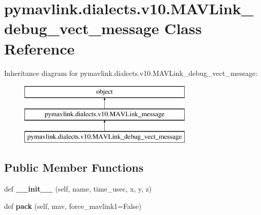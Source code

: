 \hypertarget{classpymavlink_1_1dialects_1_1v10_1_1MAVLink__debug__vect__message}{}\section{pymavlink.\+dialects.\+v10.\+M\+A\+V\+Link\+\_\+debug\+\_\+vect\+\_\+message Class Reference}
\label{classpymavlink_1_1dialects_1_1v10_1_1MAVLink__debug__vect__message}
Inheritance diagram for pymavlink.\+dialects.\+v10.\+M\+A\+V\+Link\+\_\+debug\+\_\+vect\+\_\+message\+:\begin{figure}[H]
\begin{center}
\leavevmode
\includegraphics[height=3.000000cm]{classpymavlink_1_1dialects_1_1v10_1_1MAVLink__debug__vect__message}
\end{center}
\end{figure}
\subsection*{Public Member Functions}
\begin{DoxyCompactItemize}
\item 
\mbox{\label{classpymavlink_1_1dialects_1_1v10_1_1MAVLink__debug__vect__message_ae6115920ccc058da1b8aee2a61f2d9fc}} 
def {\bfseries \+\_\+\+\_\+init\+\_\+\+\_\+} (self, name, time\+\_\+usec, x, y, z)
\item 
\mbox{\label{classpymavlink_1_1dialects_1_1v10_1_1MAVLink__debug__vect__message_afb50f45f32a423507c393efa613cd8ce}} 
def {\bfseries pack} (self, mav, force\+\_\+mavlink1=False)
\end{DoxyCompactItemize}
